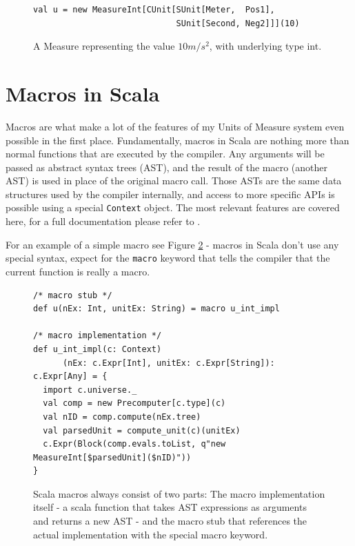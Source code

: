 \documentclass[12pt,oneside,a4paper]{scrbook}
\begin{document}
\begin{figure}
\begin{verbatim}
val u = new MeasureInt[CUnit[SUnit[Meter,  Pos1],
                             SUnit[Second, Neg2]]](10)
\end{verbatim}
\caption{A Measure representing the value $10 m/s^2$, with underlying type int.}
\label{code:scala_measure}
\end{figure}


\section{Macros in Scala}
\label{sec:macros}

Macros are what make a lot of the features of my Units of Measure system even possible in the first place. Fundamentally, macros in Scala are nothing more than normal functions that are executed by the compiler. Any arguments will be passed as abstract syntax trees (AST), and the result of the macro (another AST) is used in place of the original macro call. Those ASTs are the same data structures used by the compiler internally, and access to more specific APIs is possible using a special \verb|Context| object. The most relevant features are covered here, for a full documentation please refer to \citep{Eugene13}.

For an example of a simple macro see Figure \ref{code:scala_macro} - macros in Scala don't use any special syntax, expect for the \verb|macro| keyword that tells the compiler that the current function is really a macro.



\begin{figure}
\begin{verbatim}
/* macro stub */
def u(nEx: Int, unitEx: String) = macro u_int_impl

/* macro implementation */
def u_int_impl(c: Context)
      (nEx: c.Expr[Int], unitEx: c.Expr[String]): c.Expr[Any] = {
  import c.universe._
  val comp = new Precomputer[c.type](c)
  val nID = comp.compute(nEx.tree)
  val parsedUnit = compute_unit(c)(unitEx)
  c.Expr(Block(comp.evals.toList, q"new MeasureInt[$parsedUnit]($nID)"))
}
\end{verbatim}
\caption{Scala macros always consist of two parts: The macro implementation itself - a scala function that takes AST expressions as arguments and returns a new AST - and the macro stub that references the actual implementation with the special macro keyword.}
\label{code:scala_macro}
\end{figure}
\end{document}
